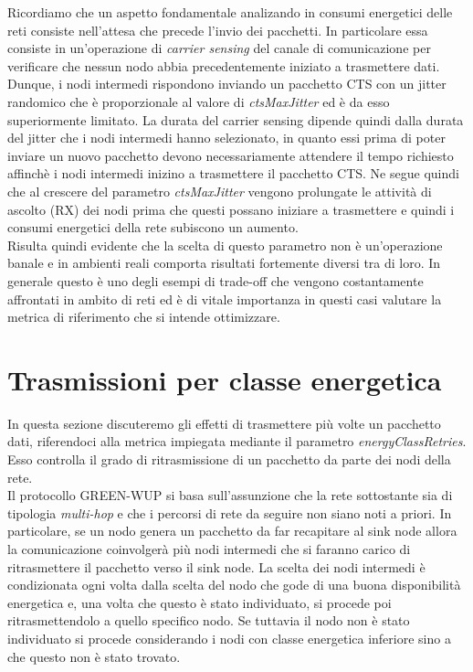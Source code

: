 \documentclass[binding=0.6cm,TFA]{sapthesis}
\begin{document}
Ricordiamo che un aspetto fondamentale analizando in consumi energetici delle reti consiste nell'attesa che precede l'invio dei pacchetti. In particolare essa
consiste in un'operazione di \emph{carrier sensing} del canale di comunicazione per verificare che nessun nodo abbia precedentemente iniziato a trasmettere dati.
Dunque, i nodi intermedi rispondono inviando un pacchetto CTS con un jitter randomico che è proporzionale al valore di \emph{ctsMaxJitter} ed è da esso superiormente
limitato. La durata del carrier sensing dipende quindi dalla durata del jitter che i nodi intermedi hanno selezionato, in quanto essi prima di poter inviare un nuovo
pacchetto devono necessariamente attendere il tempo richiesto affinchè i nodi intermedi inizino a trasmettere il pacchetto CTS. Ne segue quindi che al crescere del
parametro \emph{ctsMaxJitter} vengono prolungate le attività di ascolto (RX) dei nodi prima che questi possano iniziare a trasmettere e quindi i consumi energetici
della rete subiscono un aumento.\\

Risulta quindi evidente che la scelta di questo parametro non è un'operazione banale e in ambienti reali comporta risultati fortemente diversi tra di loro.
In generale questo è uno degli esempi di trade-off che vengono costantamente affrontati in ambito di reti ed è di vitale importanza in questi casi valutare
la metrica di riferimento che si intende ottimizzare.

\section{Trasmissioni per classe energetica}

In questa sezione discuteremo gli effetti di trasmettere più volte un pacchetto dati, riferendoci alla metrica impiegata mediante il parametro
\emph{energyClassRetries}. Esso controlla il grado di ritrasmissione di un pacchetto da parte dei nodi della rete.\\

Il protocollo GREEN-WUP si basa sull'assunzione che la rete sottostante sia di tipologia \emph{multi-hop} e che i percorsi di rete da seguire non siano noti a priori.
In particolare, se un nodo genera un pacchetto da far recapitare al sink node allora la comunicazione coinvolgerà più nodi intermedi che si faranno
carico di ritrasmettere il pacchetto verso il sink node. La scelta dei nodi intermedi è condizionata ogni volta dalla scelta del nodo che gode
di una buona disponibilità energetica e, una volta che questo è stato individuato, si procede poi ritrasmettendolo a quello specifico nodo. Se tuttavia
il nodo non è stato individuato si procede considerando i nodi con classe energetica inferiore sino a che questo non è stato trovato. \\
\end{document}
